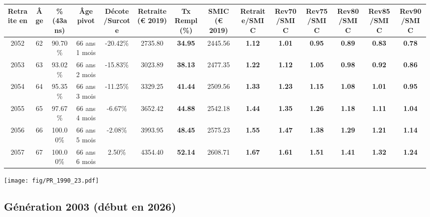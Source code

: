 \begin{adjustbox}{max width=\textwidth} 
\begin{tabular}[htb]{|c|c||c|c|c||c|c||c||c|c|c|c|c|c|} 
\hline 
 Retraite en &  Âge &  \%(43ans) &  Âge pivot &  Décote/Surcote &  Retraite (\euro{} 2019) &  Tx Rempl(\%) &  SMIC (\euro{} 2019) &  Retraite/SMIC &  Rev70/SMIC &  Rev75/SMIC &  Rev80/SMIC &  Rev85/SMIC &  Rev90/SMIC \\ 
\hline \hline 
 2052 &  62 &  90.70\% &  66 ans 1 mois &  -20.42\% &  2735.80 &  {\bf 34.95} &  2445.56 &  {\bf 1.12} &  {\bf 1.01} &  {\bf {\color{red} 0.95}} &  {\bf {\color{red} 0.89}} &  {\bf {\color{red} 0.83}} &  {\bf {\color{red} 0.78}} \\ 
\hline 
 2053 &  63 &  93.02\% &  66 ans 2 mois &  -15.83\% &  3023.89 &  {\bf 38.13} &  2477.35 &  {\bf 1.22} &  {\bf 1.12} &  {\bf 1.05} &  {\bf {\color{red} 0.98}} &  {\bf {\color{red} 0.92}} &  {\bf {\color{red} 0.86}} \\ 
\hline 
 2054 &  64 &  95.35\% &  66 ans 3 mois &  -11.25\% &  3329.25 &  {\bf 41.44} &  2509.56 &  {\bf 1.33} &  {\bf 1.23} &  {\bf 1.15} &  {\bf 1.08} &  {\bf 1.01} &  {\bf {\color{red} 0.95}} \\ 
\hline 
 2055 &  65 &  97.67\% &  66 ans 4 mois &  -6.67\% &  3652.42 &  {\bf 44.88} &  2542.18 &  {\bf 1.44} &  {\bf 1.35} &  {\bf 1.26} &  {\bf 1.18} &  {\bf 1.11} &  {\bf 1.04} \\ 
\hline 
 2056 &  66 &  100.00\% &  66 ans 5 mois &  -2.08\% &  3993.95 &  {\bf 48.45} &  2575.23 &  {\bf 1.55} &  {\bf 1.47} &  {\bf 1.38} &  {\bf 1.29} &  {\bf 1.21} &  {\bf 1.14} \\ 
\hline 
 2057 &  67 &  100.00\% &  66 ans 6 mois &  2.50\% &  4354.40 &  {\bf 52.14} &  2608.71 &  {\bf 1.67} &  {\bf 1.61} &  {\bf 1.51} &  {\bf 1.41} &  {\bf 1.32} &  {\bf 1.24} \\ 
\hline 
\hline 
\end{tabular} 
\end{adjustbox} 
 
 \vspace{0.1cm} 

 \begin{center}\texttt{[image: fig/PR\_1990\_23.pdf]}\end{center} \label{fig/PR_1990_23.pdf} 

\newpage 
 
\subsection{Génération 2003 (début en 2026)} 

